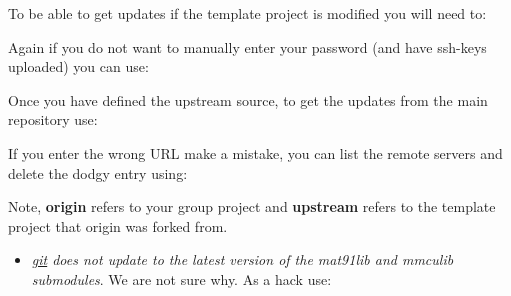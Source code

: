 To be able to get updates if the template project is modified you will
need to:

\begin{Shaded}
\begin{Highlighting}[]
\NormalTok{$ }
\NormalTok{$ }
\end{Highlighting}
\end{Shaded}

Again if you do not want to manually enter your password (and have
ssh-keys uploaded) you can use:

\begin{Shaded}
\begin{Highlighting}[]
\NormalTok{$ }
\NormalTok{$ }
\end{Highlighting}
\end{Shaded}

Once you have defined the upstream source, to get the updates from the
main repository use:

\begin{Shaded}
\begin{Highlighting}[]
\NormalTok{$ }
\end{Highlighting}
\end{Shaded}

If you enter the wrong URL make a mistake, you can list the remote
servers and delete the dodgy entry using:

\begin{Shaded}
\begin{Highlighting}[]
\NormalTok{$ }
\NormalTok{$ }
\end{Highlighting}
\end{Shaded}

Note, \textbf{origin} refers to your group project and \textbf{upstream}
refers to the template project that origin was forked from.

\begin{itemize}
\item
  \emph{\url{git} does not update to the latest version of the mat91lib
  and mmculib submodules}. We are not sure why. As a hack use:
\end{itemize}

